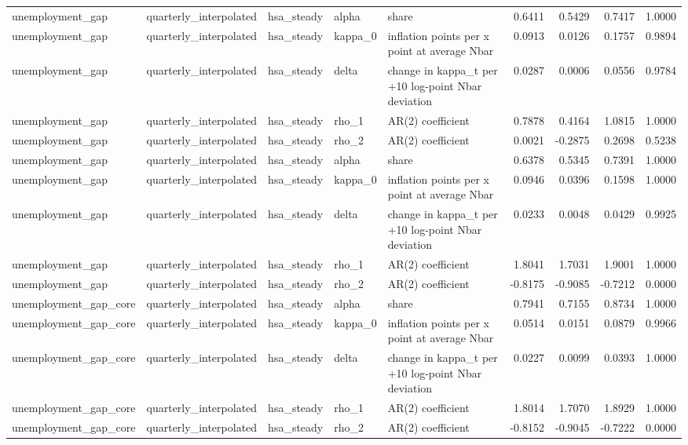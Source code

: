 \begin{tabular}{lllllrrrr}
unemployment\_gap & quarterly\_interpolated & hsa\_steady & alpha & share & 0.6411 & 0.5429 & 0.7417 & 1.0000 \\
unemployment\_gap & quarterly\_interpolated & hsa\_steady & kappa\_0 & inflation points per x point at average Nbar & 0.0913 & 0.0126 & 0.1757 & 0.9894 \\
unemployment\_gap & quarterly\_interpolated & hsa\_steady & delta & change in kappa\_t per +10 log-point Nbar deviation & 0.0287 & 0.0006 & 0.0556 & 0.9784 \\
unemployment\_gap & quarterly\_interpolated & hsa\_steady & rho\_1 & AR(2) coefficient & 0.7878 & 0.4164 & 1.0815 & 1.0000 \\
unemployment\_gap & quarterly\_interpolated & hsa\_steady & rho\_2 & AR(2) coefficient & 0.0021 & -0.2875 & 0.2698 & 0.5238 \\
unemployment\_gap & quarterly\_interpolated & hsa\_steady & alpha & share & 0.6378 & 0.5345 & 0.7391 & 1.0000 \\
unemployment\_gap & quarterly\_interpolated & hsa\_steady & kappa\_0 & inflation points per x point at average Nbar & 0.0946 & 0.0396 & 0.1598 & 1.0000 \\
unemployment\_gap & quarterly\_interpolated & hsa\_steady & delta & change in kappa\_t per +10 log-point Nbar deviation & 0.0233 & 0.0048 & 0.0429 & 0.9925 \\
unemployment\_gap & quarterly\_interpolated & hsa\_steady & rho\_1 & AR(2) coefficient & 1.8041 & 1.7031 & 1.9001 & 1.0000 \\
unemployment\_gap & quarterly\_interpolated & hsa\_steady & rho\_2 & AR(2) coefficient & -0.8175 & -0.9085 & -0.7212 & 0.0000 \\
unemployment\_gap\_core & quarterly\_interpolated & hsa\_steady & alpha & share & 0.7941 & 0.7155 & 0.8734 & 1.0000 \\
unemployment\_gap\_core & quarterly\_interpolated & hsa\_steady & kappa\_0 & inflation points per x point at average Nbar & 0.0514 & 0.0151 & 0.0879 & 0.9966 \\
unemployment\_gap\_core & quarterly\_interpolated & hsa\_steady & delta & change in kappa\_t per +10 log-point Nbar deviation & 0.0227 & 0.0099 & 0.0393 & 1.0000 \\
unemployment\_gap\_core & quarterly\_interpolated & hsa\_steady & rho\_1 & AR(2) coefficient & 1.8014 & 1.7070 & 1.8929 & 1.0000 \\
unemployment\_gap\_core & quarterly\_interpolated & hsa\_steady & rho\_2 & AR(2) coefficient & -0.8152 & -0.9045 & -0.7222 & 0.0000 \\

\end{tabular}
